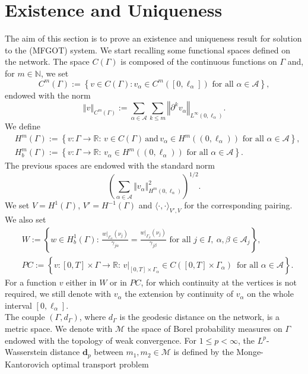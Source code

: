 \documentclass[smallextended,referee,envcountsect,]{svjour3}
\newcommand{\R}{{\mathbb{R}}}
\newcommand{\lra}{\longrightarrow}
\newcommand{\Wass}{\mathbf{d}}
\newcommand{\G}{\Gamma}
\newcommand{\cA}{{\mathcal A}}
\newcommand{\cM}{{\mathcal M}}
\renewcommand{\a}{{\alpha}}
\begin{document}
\section{Existence and Uniqueness}\label{sec:existence}
The aim of this section is to prove an existence and uniqueness result for  
solution to the {(MFGOT)} system. We start recalling some functional spaces defined on the network. The space
$C(\Gamma)$ is composed of the continuous functions on $\Gamma$ and,  
for $m\in\mathbb{N}$, we set
\[
C^{m}\left(\Gamma\right):=\left\{ v\in C\left(\Gamma\right):v_{\alpha}\in C^{m}\left(\left[0,\ell_{\alpha}\right]\right)\text{ for all }\alpha\in\cA\right\} ,
\]
  endowed with the norm
$$ 
\left\Vert v\right\Vert _{C^{m}\left(\Gamma\right)}:= {\sum}_{\alpha\in\cA}{\sum}_{k\le m}\left\Vert \partial^{k}v_{\alpha}\right\Vert _{L^{\infty}\left(0,\ell_{\alpha}\right)}.
$$
We define
\begin{align*}
	&H^m(\G):=\left\{ v:\G \lra\R:\, v\in C\left(\Gamma\right)\, \text{and}\,v_{\alpha}\in  H^m\left((0,\ell_{\alpha})\right)\text{ for all }\alpha\in\cA\right\},\\
	&H^{m}_{b}(\Gamma):=\left\{v:\Gamma\lra\R:\,v_{\alpha}\in H^m((0,\ell_{\alpha}))\text{ for all }\alpha\in\cA\right\}.
\end{align*}
The previous spaces are endowed with the standard norm
$$
\left( \sum_{\alpha\in\cA}\Vert   v_{\alpha} \Vert _{H^m(0,\ell_\a)}^{2}\right)^{1/2}.
$$
We set $V=H^1(\G)$, $V'=H^{-1}(\G)$ and $\langle \cdot,\cdot\rangle_{V', V}$  for the corresponding pairing. We also set
\begin{align*}
&W:=\left\{w\in H_{b}^{1}\left(\Gamma\right):\,\frac{w|_{\Gamma_{\alpha}}(\nu_{j})}{\gamma_{j\alpha}}=\frac{w|_{\Gamma_{\beta}}(\nu_{j})}{\gamma_{j\beta}}\text{ for all }j\in I,\ \alpha,\beta\in\cA_{j}\right\}, \\
&PC:=\left\{v:[0,T]\times\G\lra \R:\,v|_{[0,T]\times\G_{\alpha}}\in C([0,T]\times\G_{\a})\, \text{ for all $\alpha\in \cA$}\right\}.	
\end{align*}
For a  function  $v$ either in  $W$ or in $PC$, for which continuity at the vertices is not required, we still denote with $v_\alpha$ the extension by continuity of $v_\alpha$ on the whole interval $[0,\ell_\alpha]$. \\
The couple $(\G,d_\G)$, where $d_\G$ is the geodesic distance on the network, is a metric space. We denote with $\cM$ the space of Borel probability measures on $\G$ endowed with the topology of weak convergence. For $1 \le p < \infty$, the $L^p$-Wasserstein distance $\Wass_p$ between $m_1,m_2 \in\cM$ is defined by the Monge-Kantorovich optimal transport problem
\end{document}
